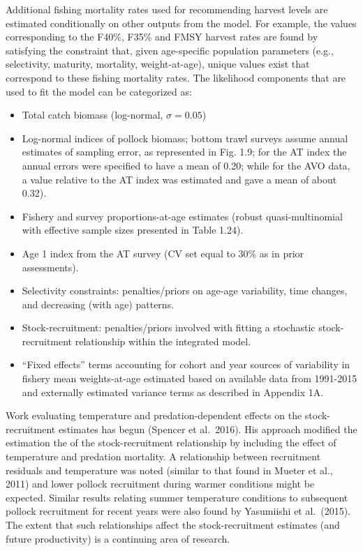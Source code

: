 Additional fishing mortality rates used for recommending harvest levels
are estimated conditionally on other outputs from the model. For
example, the values corresponding to the F40\%, F35\% and FMSY harvest
rates are found by satisfying the constraint that, given age-specific
population parameters (e.g., selectivity, maturity, mortality,
weight-at-age), unique values exist that correspond to these fishing
mortality rates. The likelihood components that are used to fit the
model can be categorized as:

\begin{itemize}
\tightlist
\item
  Total catch biomass (log-normal, \(\sigma=0.05\))\\
\item
  Log-normal indices of pollock biomass; bottom trawl surveys assume
  annual estimates of sampling error, as represented in Fig. 1.9; for
  the AT index the annual errors were specified to have a mean of 0.20;
  while for the AVO data, a value relative to the AT index was estimated
  and gave a mean of about 0.32).\\
\item
  Fishery and survey proportions-at-age estimates (robust
  quasi-multinomial with effective sample sizes presented in Table
  1.24).\\
\item
  Age 1 index from the AT survey (CV set equal to 30\% as in prior
  assessments).\\
\item
  Selectivity constraints: penalties/priors on age-age variability, time
  changes, and decreasing (with age) patterns.\\
\item
  Stock-recruitment: penalties/priors involved with fitting a stochastic
  stock-recruitment relationship within the integrated model.\\
\item
  ``Fixed effects'' terms accounting for cohort and year sources of
  variability in fishery mean weights-at-age estimated based on
  available data from 1991-2015 and externally estimated variance terms
  as described in Appendix 1A.
\end{itemize}

Work evaluating temperature and predation-dependent effects on the
stock-recruitment estimates has begun (Spencer et al.~2016). His
approach modified the estimation the of the stock-recruitment
relationship by including the effect of temperature and predation
mortality. A relationship between recruitment residuals and temperature
was noted (similar to that found in Mueter et al., 2011) and lower
pollock recruitment during warmer conditions might be expected. Similar
results relating summer temperature conditions to subsequent pollock
recruitment for recent years were also found by Yasumiishi et
al.~(2015). The extent that such relationships affect the
stock-recruitment estimates (and future productivity) is a continuing
area of research.

